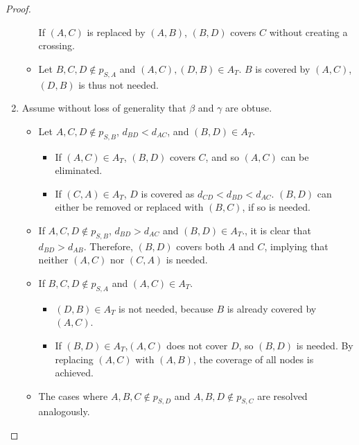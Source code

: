 \begin{proof}
\begin{enumerate}
\begin{itemize}
				If $(A,C)$ is replaced by $(A,B)$, $(B,D)$ covers $C$ without creating a crossing. 
			\item Let $B,C,D\not\in p_{S,A}$ and $(A,C), (D,B)\in A_T$. $B$ is covered by $(A,C)$, $(D,B)$ is thus not needed. 
		\end{itemize}
	\item Assume without loss of generality that $\beta$ and $\gamma$ are obtuse.
			\begin{itemize}
				\item Let $A,C,D\not\in p_{S,B}$, $d_{BD}<d_{AC}$, and $(B,D)\in A_T$. 
					\begin{itemize}
						\item If $(A,C)\in A_T$, $(B,D)$ covers $C$, and so $(A,C)$ can be eliminated.
						\item If $(C,A)\in A_T$, $D$ is covered as $d_{CD}<d_{BD}<d_{AC}$.
							$(B,D)$ can either be removed or replaced with $(B,C)$, if so is needed.
					\end{itemize}
				\item If $A,C,D\not\in p_{S,B}$, $d_{BD}>d_{AC}$ and $(B,D)\in A_T$., it is clear that $d_{BD}>d_{AB}$. 
					Therefore, $(B,D)$ covers both $A$ and $C$, implying that neither $(A,C)$ nor $(C,A)$ is needed.
				\item If $B,C,D\not\in p_{S,A}$ and $(A,C)\in A_T$.
					\begin{itemize}
						\item $(D,B)\in A_T$ is not needed, because $B$ is already covered by $(A,C)$.
						\item If $(B,D)\in A_T$,$(A,C)$ does not cover $D$, so $(B,D)$ is needed. 
							By replacing $(A,C)$ with $(A,B)$, the coverage of all nodes is achieved.
					\end{itemize}
				\item The cases where $A,B,C\not\in p_{S,D}$ and $A,B,D\not\in p_{S,C}$ are resolved analogously.
		\end{itemize}
	
\end{enumerate}


\end{proof}
